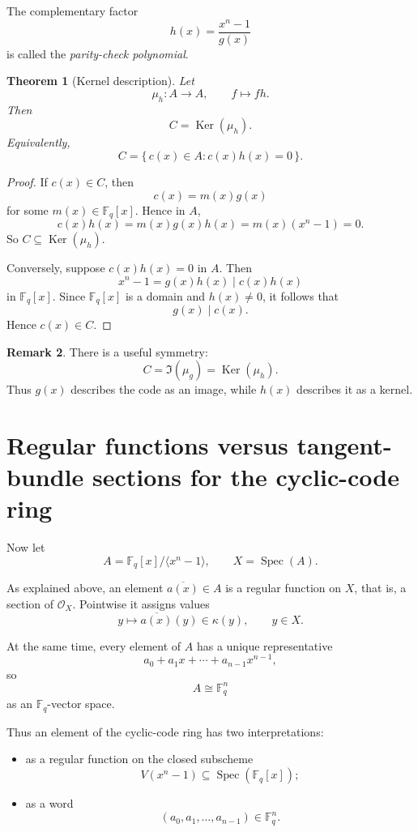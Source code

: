 \documentclass[11pt]{article}
\newtheorem{theorem}{Theorem}[section]
\theoremstyle{definition}
\newtheorem{remark}[theorem]{Remark}
\newcommand{\F}{\mathbb{F}}
\newcommand{\Spec}{\operatorname{Spec}}
\newcommand{\Ker}{\operatorname{Ker}}
\newcommand{\kk}[1]{\kappa\!\left(#1\right)}
\newcommand{\ideal}[1]{\langle #1\rangle}
\newcommand{\ol}[1]{\overline{#1}}
\begin{document}
	The complementary factor
	\[
	h(x)=\frac{x^n-1}{g(x)}
	\]
	is called the \emph{parity-check polynomial}.
	
	\begin{theorem}[Kernel description]\label{thm:parity-check}
		Let
		\[
		\mu_h:A\to A,
		\qquad
		f\mapsto fh.
		\]
		Then
		\[
		C=\Ker(\mu_h).
		\]
		Equivalently,
		\[
		C=\{\,c(x)\in A : c(x)h(x)=0\,\}.
		\]
	\end{theorem}
	
	\begin{proof}
		If \(c(x)\in C\), then
		\[
		c(x)=m(x)g(x)
		\]
		for some \(m(x)\in \F_q[x]\). Hence in \(A\),
		\[
		c(x)h(x)=m(x)g(x)h(x)=m(x)(x^n-1)=0.
		\]
		So \(C\subseteq \Ker(\mu_h)\).
		
		Conversely, suppose \(c(x)h(x)=0\) in \(A\). Then
		\[
		x^n-1=g(x)h(x)\mid c(x)h(x)
		\]
		in \(\F_q[x]\). Since \(\F_q[x]\) is a domain and \(h(x)\neq 0\), it follows that
		\[
		g(x)\mid c(x).
		\]
		Hence \(c(x)\in C\).
	\end{proof}
	
	\begin{remark}
		There is a useful symmetry:
		\[
		C=\Im(\mu_g)=\Ker(\mu_h).
		\]
		Thus \(g(x)\) describes the code as an image, while \(h(x)\) describes it as a kernel.
	\end{remark}
	
	\section{Regular functions versus tangent-bundle sections for the cyclic-code ring}
	
	Now let
	\[
	A=\F_q[x]/\ideal{x^n-1},
	\qquad
	X=\Spec(A).
	\]
	
	As explained above, an element \(\ol{a(x)}\in A\) is a regular function on \(X\), that is, a section of \(\mathcal O_X\). Pointwise it assigns values
	\[
	y\longmapsto \ol{a(x)}(y)\in \kk{y},
	\qquad y\in X.
	\]
	
	At the same time, every element of \(A\) has a unique representative
	\[
	a_0+a_1x+\cdots+a_{n-1}x^{n-1},
	\]
	so
	\[
	A\cong \F_q^n
	\]
	as an \(\F_q\)-vector space.
	
	Thus an element of the cyclic-code ring has two interpretations:
	
	\begin{itemize}
		\item as a regular function on the closed subscheme
		\[
		V(x^n-1)\subseteq \Spec(\F_q[x]);
		\]
		\item as a word
		\[
		(a_0,a_1,\dots,a_{n-1})\in \F_q^n.
		\]
	\end{itemize}
	
\end{document}

